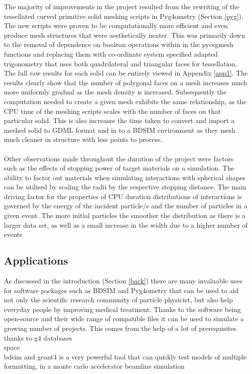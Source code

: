 \documentclass[12pt,a4paper]{article}
\begin{document}
The majority of improvements in the project resulted from the rewriting of the tessellated curved primitive solid meshing scripts in Pyg4ometry (Section \ref{pyg}). The new scripts were proven to be computationally more efficient and even produce mesh structures that were aesthetically neater. This was primarily down to the removal of dependence on boolean operations within in the pycsgmesh functions and replacing them with co-ordinate system specified adapted trigonometry that uses both quadrilateral and triangular faces for tessellation. The full raw results for each solid can be entirely viewed in Appendix \ref{app1}. The results clearly show that the number of polygonal faces on a mesh increases much more uniformly gradual as the mesh density is increased. Subsequently the computation needed to create a given mesh exhibits the same relationship, as the CPU time of the meshing scripts scales with the number of faces on that particular solid. This is also increases the time taken to convert and import a meshed solid to GDML format and in to a BDSIM environment as they mesh much cleaner in structure with less points to process. 
\\\\
Other observations made throughout the duration of the project were factors such as the effects of stopping power of target materials on a simulation. The ability to factor out materials when simulating interactions with spherical shapes can be utilised by scaling the radii by the respective stopping distance. The main driving factor for the properties of CPU duration distributions of interactions is governed by the energy of the incident particle/s and the number of particles in a given event. The more initial particles the smoother the distribution as there is a larger data set, as well as a small increase in the width due to a higher number of events 

\subsection{Applications}
As discussed in the introduction (Section \ref{back}) there are many invaluable uses for software packages such as BDSIM and Pyg4ometry that can be used to aid not only the scientific research community of particle physicist, but also help everyday people by improving medical treatment. Thanks to the software being open-source and their wide range of compatible files it can be used to simulate a growing number of projects. This comes from the help of a lot of prerequisites 
thanks to g4 databases\\
space\\
bdsim and geant4 is a very powerful tool that can quickly test models of multiple formatting, in a monte carlo accelerator beamline simulation
\end{document}
